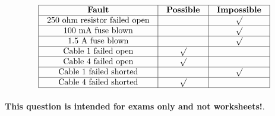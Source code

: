 






$$\vbox{\offinterlineskip
\halign{\strut
\vrule \quad\hfil # \ \hfil & 
\vrule \quad\hfil # \ \hfil & 
\vrule \quad\hfil # \ \hfil \vrule \cr
\noalign{\hrule}
%
{\bf Fault} & {\bf Possible} & {\bf Impossible} \cr
%
\noalign{\hrule}
%
250 ohm resistor failed open &  & $\surd$ \cr
%
\noalign{\hrule}
%
100 mA fuse blown &  & $\surd$ \cr
%
\noalign{\hrule}
%
1.5 A fuse blown &  & $\surd$ \cr
%
\noalign{\hrule}
%
Cable 1 failed open & $\surd$ &  \cr
%
\noalign{\hrule}
%
Cable 4 failed open & $\surd$ &  \cr
%
\noalign{\hrule}
%
Cable 1 failed shorted &  & $\surd$ \cr
%
\noalign{\hrule}
%
Cable 4 failed shorted & $\surd$ &  \cr
%
\noalign{\hrule}
} %
}$$ %







{\bf This question is intended for exams only and not worksheets!}.



